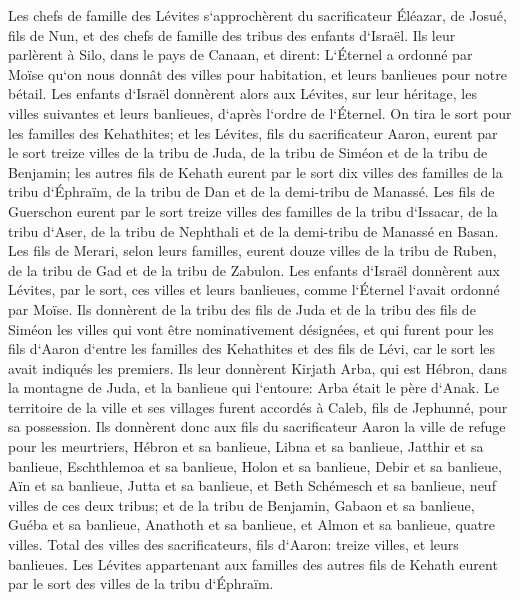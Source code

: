 \verse Les chefs de famille des Lévites s`approchèrent du sacrificateur Éléazar, de Josué, fils de Nun, et des chefs de famille des tribus des enfants d`Israël. 
\verse Ils leur parlèrent à Silo, dans le pays de Canaan, et dirent: L`Éternel a ordonné par Moïse qu`on nous donnât des villes pour habitation, et leurs banlieues pour notre bétail. 
\verse Les enfants d`Israël donnèrent alors aux Lévites, sur leur héritage, les villes suivantes et leurs banlieues, d`après l`ordre de l`Éternel. 
\verse On tira le sort pour les familles des Kehathites; et les Lévites, fils du sacrificateur Aaron, eurent par le sort treize villes de la tribu de Juda, de la tribu de Siméon et de la tribu de Benjamin; 
\verse les autres fils de Kehath eurent par le sort dix villes des familles de la tribu d`Éphraïm, de la tribu de Dan et de la demi-tribu de Manassé. 
\verse Les fils de Guerschon eurent par le sort treize villes des familles de la tribu d`Issacar, de la tribu d`Aser, de la tribu de Nephthali et de la demi-tribu de Manassé en Basan. 
\verse Les fils de Merari, selon leurs familles, eurent douze villes de la tribu de Ruben, de la tribu de Gad et de la tribu de Zabulon. 
\verse Les enfants d`Israël donnèrent aux Lévites, par le sort, ces villes et leurs banlieues, comme l`Éternel l`avait ordonné par Moïse. 
\verse Ils donnèrent de la tribu des fils de Juda et de la tribu des fils de Siméon les villes qui vont être nominativement désignées, 
\verse et qui furent pour les fils d`Aaron d`entre les familles des Kehathites et des fils de Lévi, car le sort les avait indiqués les premiers. 
\verse Ils leur donnèrent Kirjath Arba, qui est Hébron, dans la montagne de Juda, et la banlieue qui l`entoure: Arba était le père d`Anak. 
\verse Le territoire de la ville et ses villages furent accordés à Caleb, fils de Jephunné, pour sa possession. 
\verse Ils donnèrent donc aux fils du sacrificateur Aaron la ville de refuge pour les meurtriers, Hébron et sa banlieue, Libna et sa banlieue, 
\verse Jatthir et sa banlieue, Eschthlemoa et sa banlieue, 
\verse Holon et sa banlieue, Debir et sa banlieue, 
\verse Aïn et sa banlieue, Jutta et sa banlieue, et Beth Schémesch et sa banlieue, neuf villes de ces deux tribus; 
\verse et de la tribu de Benjamin, Gabaon et sa banlieue, Guéba et sa banlieue, 
\verse Anathoth et sa banlieue, et Almon et sa banlieue, quatre villes. 
\verse Total des villes des sacrificateurs, fils d`Aaron: treize villes, et leurs banlieues. 
\verse Les Lévites appartenant aux familles des autres fils de Kehath eurent par le sort des villes de la tribu d`Éphraïm. 
